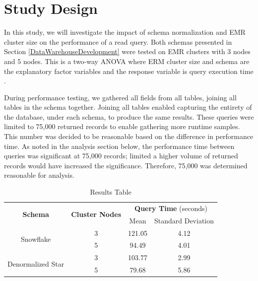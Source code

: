 \documentclass[journal]{IEEEtran}
\begin{document}
\section{Study Design}
\label{StudyDesign}

In this study, we will investigate the impact of schema normalization and
 EMR cluster size on the performance of a read query.
Both schemas presented in Section \ref{DataWarehouseDevelopment} were tested on
 EMR clusters with 3 nodes and 5 nodes.
This is a two-way ANOVA where ERM cluster size and schema
 are the explanatory factor variables and the response variable is query
 execution time \cite{RepeatMeasures}.

During performance testing, we gathered all fields from all tables,
 joining all tables in the schema together. 
Joining all tables enabled capturing the entirety of the database,
 under each schema, to produce the same results. 
These queries were limited to 75,000 returned records to enable gathering more runtime samples. 
This number was decided to be reasonable based on the difference in performance time. 
As noted in the analysis section below,
 the performance time between queries was significant at 75,000 records;
 limited a higher volume of returned records would have increased the significance. 
Therefore, 75,000 was determined reasonable for analysis.


\begin{table}
	\renewcommand{\arraystretch}{1.3}
	\caption{Results Table}
	\label{ResultsTable}
	\centering
	\begin{tabular}{c c c c}
		\hline
		\hline
		\multirow{2}{*}{\textbf{Schema}} & \multirow{2}{*}{\textbf{Cluster Nodes}} &
		\multicolumn{2}{c}{\textbf{Query Time} (seconds)}   \\
		\cline{3-4}
		&     & Mean & Standard Deviation\\
		\hline
		\multirow{2}{*}{Snowflake}         & 3   & 121.05 & 4.12 \\
		
		& 5   & 94.49 & 4.01  \\
		
		\hline
		\multirow{2}{*}{Denormalized Star} & 3   & 103.77 & 2.99 \\
		
		& 5   & 79.68 & 5.86  \\
		
		\hline
		\hline
	\end{tabular}
\end{table}
\end{document}

